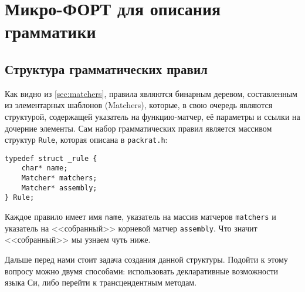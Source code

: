 \documentclass[10pt]{report}
\begin{document}
\section{Микро-ФОРТ для описания грамматики}
\subsection{Структура грамматических правил}
Как видно из \ref{sec:matchers}, правила являются бинарным деревом, составленным из элементарных шаблонов (Matchers), которые, в свою очередь являются структурой, содержащей указатель на функцию-матчер, её параметры и ссылки на дочерние элементы. 
Сам набор грамматических правил является массивом структур {\tt Rule}, которая описана в {\tt packrat.h}:
\begin{lstlisting}
typedef struct _rule {
	char* name;
	Matcher* matchers;
	Matcher* assembly;
} Rule;
\end{lstlisting}
Каждое правило имеет имя {\tt name}, указатель на массив матчеров {\tt matchers} и указатель на <<собранный>> корневой матчер {\tt assembly}. Что значит <<собранный>> мы узнаем чуть ниже.

Дальше перед нами стоит задача создания данной структуры.
Подойти к этому вопросу можно двумя способами: использовать декларативные возможности языка Си, либо перейти к трансцендентным методам.
\end{document}
